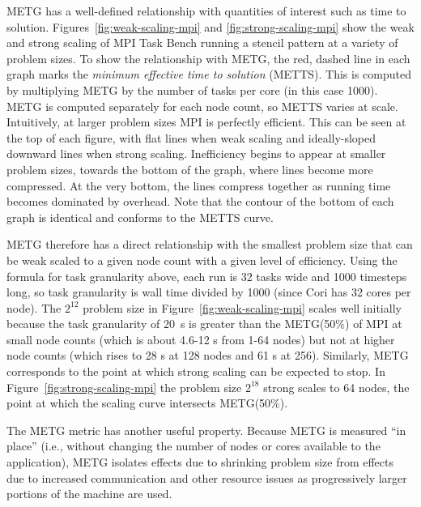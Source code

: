 METG has a well-defined
relationship with quantities of interest such as
time to solution. Figures~\ref{fig:weak-scaling-mpi} and
\ref{fig:strong-scaling-mpi} show the weak and strong scaling of MPI
Task Bench running a stencil pattern at a variety of problem
sizes. {\color{blue} To show the relationship with METG, the red,
  dashed line in each graph marks the \emph{minimum effective time to
    solution} (METTS). This is computed by multiplying METG by the
  number of tasks per core (in this case 1000). METG is computed
  separately for each node count, so METTS varies at scale.}
Intuitively, at
larger problem sizes MPI is perfectly efficient. This can be seen at
the top of each figure, with flat lines when weak scaling and
ideally-sloped downward lines when strong scaling. Inefficiency begins
to appear at smaller problem sizes, towards the bottom of the graph,
where lines become more compressed. At the
very bottom, the lines compress together as running time becomes
dominated by overhead. Note that the contour of the bottom of each
graph is identical and conforms to the METTS curve.



METG therefore has a direct relationship with the smallest problem
size that can be weak scaled to a given node count with a given level
of efficiency. Using the formula for task granularity above, each run
is 32 tasks wide and 1000 timesteps long, so task granularity is wall
time divided by 1000 (since Cori has 32 cores per node). The $2^{12}$
problem size in Figure~\ref{fig:weak-scaling-mpi} scales well
initially because the task granularity of 20~\textmu{}s is greater
than the METG(50\%) of MPI at small node counts (which is about 4.6-12
\textmu{}s from 1-64 nodes) but not at higher node counts (which rises
to 28 \textmu{}s at 128 nodes and 61 \textmu{}s at 256). Similarly,
METG corresponds to the point at which strong scaling can be expected
to stop. In Figure~\ref{fig:strong-scaling-mpi} the problem size
$2^{18}$ strong scales to 64 nodes, the point at which the
scaling curve intersects METG(50\%).

The METG metric has another useful property. Because METG is measured ``in place'' (i.e.,
without changing the number of nodes or cores available to the
application), METG isolates effects
due to shrinking problem size from effects due to
increased communication and other resource issues as
progressively larger portions of the machine are used.
